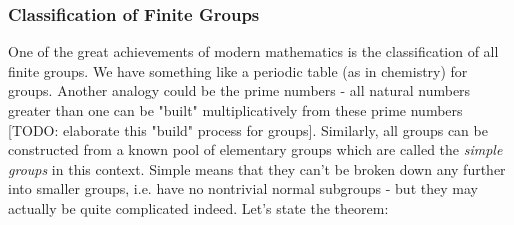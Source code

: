 



\subsubsection{Classification of Finite Groups}
One of the great achievements of modern mathematics is the classification of all finite groups. We have something like a periodic table (as in chemistry) for groups. Another analogy could be the prime numbers - all natural numbers greater than one can be "built" multiplicatively from these prime numbers [TODO: elaborate this "build" process for groups]. Similarly, all groups can be constructed from a known pool of elementary groups which are called the \emph{simple groups} in this context. Simple means that they can't be broken down any further into smaller groups, i.e. have no nontrivial normal subgroups - but they may actually be quite complicated indeed. Let's state the theorem:

